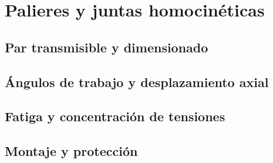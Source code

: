 \chapter{Palieres y juntas homocinéticas}
\label{ch:palieres_juntas}

\begin{objetivos}
  \item {}
  \item {}
  \item {}
\end{objetivos}


\section{Par transmisible y dimensionado}
\label{sec:palieres_juntas:01}

\section{Ángulos de trabajo y desplazamiento axial}
\label{sec:palieres_juntas:02}

\section{Fatiga y concentración de tensiones}
\label{sec:palieres_juntas:03}

\section{Montaje y protección}
\label{sec:palieres_juntas:04}


\begin{caso}
\end{caso}

